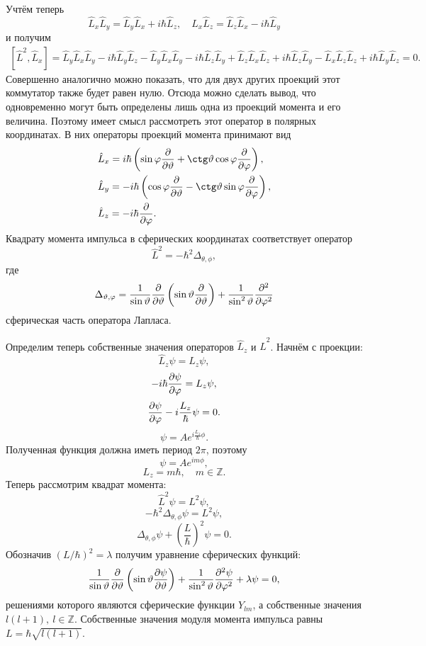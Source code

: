 \documentclass{hedexams}
\begin{document}
Учтём теперь
\[
    \hat{L}_x\hat{L}_y = \hat{L}_y\hat{L}_x + i\hbar\hat{L}_z, \quad
    \hat{L}_x\hat{L}_z = \hat{L}_z\hat{L}_x - i\hbar\hat{L}_y
\]
и получим
\begin{gather*}
    \left[ \hat{L}^2, \hat{L}_x \right] =
    \hat{L}_y\hat{L}_x\hat{L}_y - i\hbar\hat{L}_y\hat{L}_z -
    \hat{L}_y\hat{L}_x\hat{L}_y - i\hbar\hat{L}_z\hat{L}_y +
    \hat{L}_z\hat{L}_x\hat{L}_z + i\hbar\hat{L}_z\hat{L}_y -
    \hat{L}_x\hat{L}_z\hat{L}_z + i\hbar\hat{L}_y\hat{L}_z = 0.
\end{gather*}
Совершенно аналогично можно показать, что для двух других проекций этот
коммутатор также будет равен нулю. Отсюда можно сделать вывод, что одновременно
могут быть определены лишь одна из проекций момента и его величина. Поэтому
имеет смысл рассмотреть этот оператор в полярных координатах. В них операторы
проекций момента принимают вид
\begin{align*}
    & \hat{L}_x = i\hbar\left(\sin\phi\pder{}{\theta} +
        \ctg\theta\cos\phi\pder{}{\phi}\right), \\
    & \hat{L}_y = -i\hbar\left(\cos\phi\pder{}{\theta} -
        \ctg\theta\sin\phi\pder{}{\phi}\right), \\
    & \hat{L}_z = -i\hbar\pder{}{\phi}.
\end{align*}
Квадрату момента импульса в сферических координатах соответствует оператор
\[
    \hat{L}^2 = -\hbar^2\Delta_{\theta,\phi},
\]
где
\[
    \Delta_{\vartheta,\varphi} = \frac{1}{\sin\vartheta}\frac{\partial }{\partial \vartheta}
        \left(\sin\vartheta\frac{\partial }{\partial \vartheta}\right) +
        \frac{1}{\sin^2\vartheta}\frac{\partial^2 }{\partial \varphi^2}
\]
сферическая часть оператора Лапласа.

Определим теперь собственные значения операторов \( \hat{L}_z \) и
\( \hat{L}^2 \). Начнём с проекции:
\[
    \hat{L}_z\psi = L_z\psi,
\]
\[
    -i\hbar\frac{\partial \psi}{\partial \varphi} = L_z\psi,
\]
\[
    \frac{\partial \psi}{\partial \varphi} - i\frac{L_z}{\hbar}\psi = 0.
\]
\[
    \psi = Ae^{i\frac{L_z}{\hbar}\phi}.
\]
Полученная функция должна иметь период \( 2\pi \), поэтому
\[
    \psi = Ae^{im\phi},
\]
\[
    L_z = m\hbar,\quad m \in \mathbb{Z}.
\]
Теперь рассмотрим квадрат момента:
\[
    \hat{L}^2\psi = L^2\psi,
\]
\[
    -\hbar^2\Delta_{\theta,\phi}\psi = L^2\psi,
\]
\[
    \Delta_{\theta,\phi}\psi + (\frac{L}{\hbar})^2\psi = 0.
\]
Обозначив \( (L/\hbar)^2 = \lambda \) получим уравнение сферических функций:
\[
    \frac{1}{\sin\vartheta}\frac{\partial }{\partial \vartheta}
        \left(\sin\vartheta\frac{\partial \psi}{\partial \vartheta}\right) +
        \frac{1}{\sin^2\vartheta}\frac{\partial^2 \psi}{\partial \varphi^2} + \lambda\psi = 0,
\]
решениями которого являются сферические функции \( Y_{lm} \), а собственные
значения \( l(l+1),\ l\in\mathbb Z \). Собственные значения модуля момента
импульса равны \( L = \hbar\sqrt{l(l+1)} \).
\end{document}
